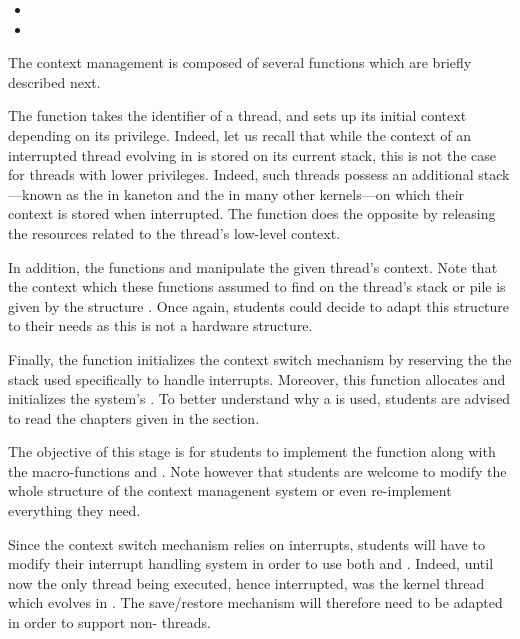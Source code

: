 \begin{itemize}
  \item
  \item
\end{itemize}

The  context management is composed of several functions which
are briefly described next.

The  function takes the identifier of a
thread, and sets up its initial context depending on its privilege. Indeed,
let us recall that while the context of an interrupted thread evolving in
 is stored on its current stack, this is not the case for threads
with lower privileges. Indeed, such threads possess an additional
stack---known as the  in kaneton and the  in
many other kernels---on which their context is stored when interrupted.
The function  does the opposite by
releasing the resources related to the thread's low-level context.

In addition, the functions  and
 manipulate the given thread's context.
Note that the context which these functions assumed to find on the thread's
stack or pile is given by the structure . Once again,
students could decide to adapt this structure to their needs as this is
not a hardware structure.

Finally, the  function initializes the
context switch mechanism by reserving the 
\ie{} the stack used specifically to handle interrupts. Moreover, this
function allocates and initializes the system's . To better understand why a  is used, students are advised
to read the chapters given in the  section.

The objective of this stage is for students to implement the
 function along with the macro-functions
 and
. Note however that students are
welcome to modify the whole structure of the context managenent system or
even re-implement everything they need.

Since the context switch mechanism relies on interrupts, students will
have to modify their interrupt handling system in order to use both
 and
. Indeed, until now the only thread
being executed, hence interrupted, was the kernel thread which evolves in
. The save/restore mechanism will therefore need to be adapted
in order to support non- threads.

